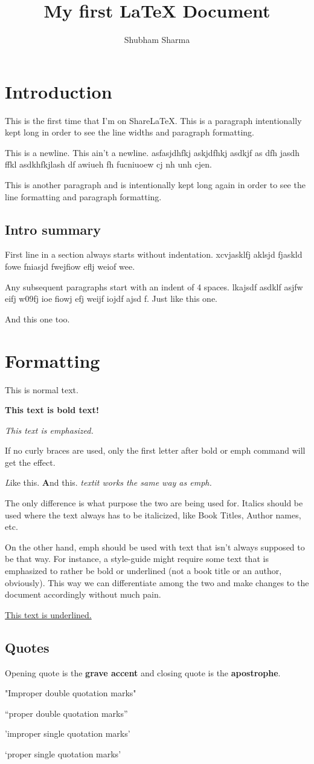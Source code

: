 \documentclass{article}
\author{Shubham Sharma}
\title{My first {\LaTeX} Document}
\begin{document}
\maketitle
\section{Introduction}

This is the first time that I'm on Share\LaTeX. This is a paragraph intentionally kept long in order to see the line widths and paragraph formatting.

This is a newline.
This ain't a newline. asfasjdhfkj askjdfhkj asdkjf as dfh jasdh ffkl asdkhfkjlash df awiueh fh fucniuoew cj nh unh cjen.

This is another paragraph and is intentionally kept long again in order to see the line formatting and paragraph formatting.
\subsection{Intro summary}
First line in a section always starts without indentation. xcvjasklfj aklsjd fjaskld fowe fniasjd fwejfiow eflj weiof wee.

Any subsequent paragraphs start with an indent of 4 spaces. lkajsdf asdklf asjfw eifj w09fj ioe fiowj efj weijf iojdf ajsd f. Just like this one.

And this one too.

\section{Formatting}
This is normal text.

\textbf {This text is bold text!}

\emph {This text is emphasized.}

If no curly braces are used, only the first letter after bold or emph command will get the effect.

\emph Like this. \textbf And this.
\textit{textit works the same way as emph.}

The only difference is what purpose the two are being used for. Italics should be used where the text always has to be italicized, like Book Titles, Author names, etc.

On the other hand, emph should be used with text that isn't always supposed to be that way. For instance, a style-guide might require some text that is emphasized to rather be bold or underlined (not a book title or an author, obviously).
This way we can differentiate among the two and make changes to the document accordingly without much pain.

\underline{This text is underlined.}

\subsection{Quotes}
Opening quote is the \textbf{grave accent} and closing quote is the \textbf{apostrophe}.

"Improper double quotation marks"

``proper double quotation marks''

'improper single quotation marks'

`proper single quotation marks'
\end{document}
